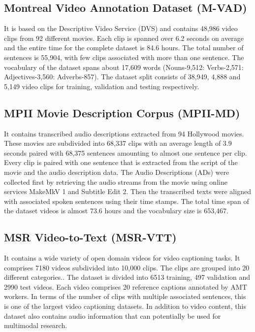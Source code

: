 \subsection{Montreal Video Annotation Dataset (M-VAD)}

\par It is based on the Descriptive Video Service (DVS) and contains 48,986 video clips from 92 different movies. Each clip is spanned over 6.2 seconds on average and the entire time for the complete dataset is 84.6 hours. The total number of sentences is 55,904, with few clips associated with more than one sentence. The vocabulary of the dataset spans about 17,609 words (Nouns-9,512: Verbs-2,571: Adjectives-3,560: Adverbs-857). The dataset split consists of 38,949, 4,888 and 5,149 video clips for training, validation and testing respectively.


\subsection{MPII Movie Description Corpus (MPII-MD)}

\par It contains transcribed audio descriptions extracted from 94 Hollywood movies. These movies are subdivided into 68,337 clips with an average length of 3.9 seconds paired with 68,375 sentences amounting to almost one sentence per clip. Every clip is paired with one sentence that is extracted from the script of the movie and the audio description data. The Audio Descriptions (ADs) were collected first by retrieving the audio streams from the movie using online services MakeMkV 1 and Subtitle Edit 2. Then the transcribed texts were aligned with associated spoken sentences using their time stamps. The total time span of the dataset videos is almost 73.6 hours and the vocabulary size is 653,467.

\subsection{MSR Video-to-Text (MSR-VTT)}

\par It contains a wide variety of open domain videos for video captioning tasks. It comprises 7180 videos subdivided into 10,000 clips. The clips are grouped into 20 different categories.. The dataset is divided into 6513 training, 497 validation and 2990 test videos. Each video comprises 20 reference captions annotated by AMT workers. In terms of the number of clips with multiple associated sentences, this is one of the largest video captioning datasets. In addition to video content, this dataset also contains audio information that can potentially be used for multimodal research.

